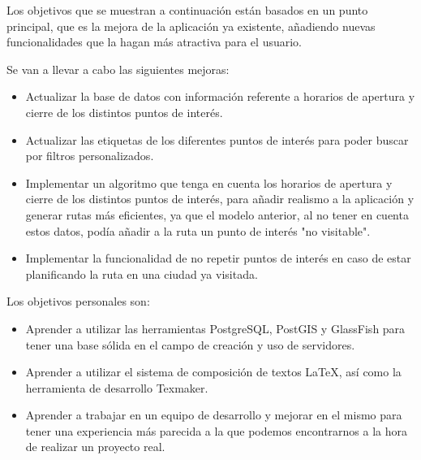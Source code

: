 
Los objetivos que se muestran a continuación están basados en un punto principal, que es la mejora de la aplicación ya existente, añadiendo nuevas funcionalidades que la hagan más atractiva para el usuario.

Se van a llevar a cabo las siguientes mejoras:
\begin{itemize}
\tightlist
\item Actualizar la base de datos con información referente a horarios de apertura y cierre de los distintos puntos de interés.
\item Actualizar las etiquetas de los diferentes puntos de interés para poder buscar por filtros personalizados.
\item Implementar un algoritmo que tenga en cuenta los horarios de apertura y cierre de los distintos puntos de interés, para añadir realismo a la aplicación y generar rutas más eficientes, ya que el modelo anterior, al no tener en cuenta estos datos, podía añadir a la ruta un punto de interés "no visitable".
\item Implementar la funcionalidad de no repetir puntos de interés en caso de estar planificando la ruta en una ciudad ya visitada.
\end{itemize}

Los objetivos personales son:
\begin{itemize}
\tightlist
\item Aprender a utilizar las herramientas PostgreSQL, PostGIS y GlassFish para tener una base sólida en el campo de creación y uso de servidores.
\item Aprender a utilizar el sistema de composición de textos LaTeX, así como la herramienta de desarrollo Texmaker.
\item Aprender a trabajar en un equipo de desarrollo y mejorar en el mismo para tener una experiencia más parecida a la que podemos encontrarnos a la hora de realizar un proyecto real.
\end{itemize}